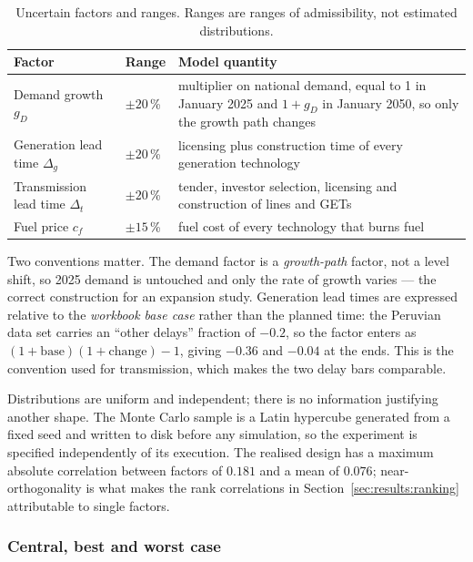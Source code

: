 \begin{table}[tb]
  \centering
  \caption{Uncertain factors and ranges. Ranges are ranges of admissibility, not
  estimated distributions.}
  \label{tab:factors}
  \small
  \begin{tabular}{@{}llp{56mm}@{}}
    \toprule
    Factor & Range & Model quantity \\
    \midrule
    Demand growth $g_D$ & $\pm20$\,\% &
      multiplier on national demand, equal to 1 in January 2025 and $1+g_D$ in
      January 2050, so only the growth path changes \\
    Generation lead time $\Delta_g$ & $\pm20$\,\% &
      licensing plus construction time of every generation technology \\
    Transmission lead time $\Delta_t$ & $\pm20$\,\% &
      tender, investor selection, licensing and construction of lines and GETs \\
    Fuel price $c_f$ & $\pm15$\,\% &
      fuel cost of every technology that burns fuel \\
    \bottomrule
  \end{tabular}
\end{table}

Two conventions matter. The demand factor is a \emph{growth-path} factor, not a level
shift, so 2025 demand is untouched and only the rate of growth varies --- the correct
construction for an expansion study. Generation lead times are expressed relative to
the \emph{workbook base case} rather than the planned time: the Peruvian data set
carries an ``other delays'' fraction of $-0.2$, so the factor enters as
$(1+\text{base})(1+\text{change})-1$, giving $-0.36$ and $-0.04$ at the ends. This is
the convention used for transmission, which makes the two delay bars comparable.

Distributions are uniform and independent; there is no information justifying another
shape. The Monte Carlo sample is a Latin hypercube \citep{mckay1992} generated from a
fixed seed and written to disk before any simulation, so the experiment is specified
independently of its execution. The realised design has a maximum absolute correlation
between factors of $0.181$ and a mean of $0.076$; near-orthogonality is what makes the
rank correlations in Section~\ref{sec:results:ranking} attributable to single factors.

\subsubsection{Central, best and worst case}
\label{sec:method:scenarios}

